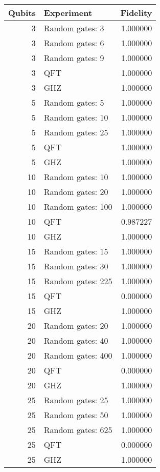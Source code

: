 \begin{table}[H]
\begin{tabular}{rlr}
\toprule
Qubits & Experiment & Fidelity \\
\midrule
3 & Random gates: 3 & 1.000000 \\
3 & Random gates: 6 & 1.000000 \\
3 & Random gates: 9 & 1.000000 \\
3 & QFT & 1.000000 \\
3 & GHZ & 1.000000 \\
5 & Random gates: 5 & 1.000000 \\
5 & Random gates: 10 & 1.000000 \\
5 & Random gates: 25 & 1.000000 \\
5 & QFT & 1.000000 \\
5 & GHZ & 1.000000 \\
10 & Random gates: 10 & 1.000000 \\
10 & Random gates: 20 & 1.000000 \\
10 & Random gates: 100 & 1.000000 \\
10 & QFT & 0.987227 \\
10 & GHZ & 1.000000 \\
15 & Random gates: 15 & 1.000000 \\
15 & Random gates: 30 & 1.000000 \\
15 & Random gates: 225 & 1.000000 \\
15 & QFT & 0.000000 \\
15 & GHZ & 1.000000 \\
20 & Random gates: 20 & 1.000000 \\
20 & Random gates: 40 & 1.000000 \\
20 & Random gates: 400 & 1.000000 \\
20 & QFT & 0.000000 \\
20 & GHZ & 1.000000 \\
25 & Random gates: 25 & 1.000000 \\
25 & Random gates: 50 & 1.000000 \\
25 & Random gates: 625 & 1.000000 \\
25 & QFT & 0.000000 \\
25 & GHZ & 1.000000 \\
\bottomrule
\end{tabular}
\end{table}
